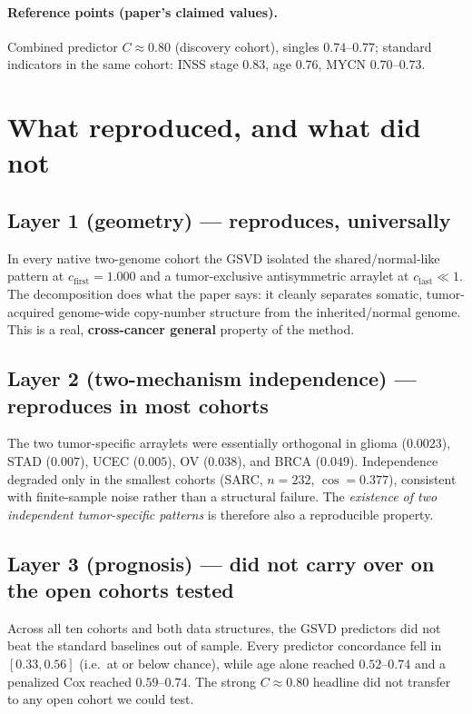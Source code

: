 \documentclass[11pt]{article}
\newcommand{\repro}{\textcolor{good}{\textbf{reproduces}}}
\newcommand{\notcarry}{\textcolor{gap}{\textbf{did not carry over}}}
\begin{document}
\paragraph{Reference points (paper's claimed values).}
Combined predictor $C \approx 0.80$ (discovery cohort), singles $0.74$--$0.77$;
standard indicators in the same cohort: INSS stage $0.83$, age $0.76$, MYCN
$0.70$--$0.73$.

\section{What reproduced, and what did not}

\subsection{Layer 1 (geometry) --- \repro{}, universally}
In every native two-genome cohort the GSVD isolated the shared/normal-like
pattern at $c_{\text{first}} = 1.000$ and a tumor-exclusive antisymmetric
arraylet at $c_{\text{last}} \ll 1$. The decomposition does what the paper says:
it cleanly separates somatic, tumor-acquired genome-wide copy-number structure
from the inherited/normal genome. This is a real, \textbf{cross-cancer general}
property of the method.

\subsection{Layer 2 (two-mechanism independence) --- \repro{} in most cohorts}
The two tumor-specific arraylets were essentially orthogonal in glioma
($0.0023$), STAD ($0.007$), UCEC ($0.005$), OV ($0.038$), and BRCA ($0.049$).
Independence degraded only in the smallest cohorts (SARC, $n=232$, $\cos =
0.377$), consistent with finite-sample noise rather than a structural failure.
The \emph{existence of two independent tumor-specific patterns} is therefore
also a reproducible property.

\subsection{Layer 3 (prognosis) --- \notcarry{} on the open cohorts tested}
Across all ten cohorts and both data structures, the GSVD predictors did not
beat the standard baselines out of sample. Every predictor concordance fell in
$[0.33, 0.56]$ (i.e.\ at or below chance), while age alone reached $0.52$--$0.74$
and a penalized Cox reached $0.59$--$0.74$. The strong $C \approx 0.80$ headline
did not transfer to any open cohort we could test.
\end{document}
